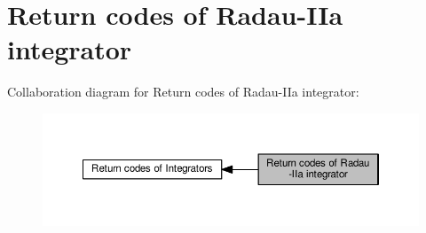 \hypertarget{group__RK__ErrCodes}{}\section{Return codes of Radau-\/\+I\+Ia integrator}
\label{group__RK__ErrCodes}
Collaboration diagram for Return codes of Radau-\/\+I\+Ia integrator\+:
\nopagebreak
\begin{figure}[H]
\begin{center}
\leavevmode
\includegraphics[width=350pt]{group__RK__ErrCodes}
\end{center}
\end{figure}
